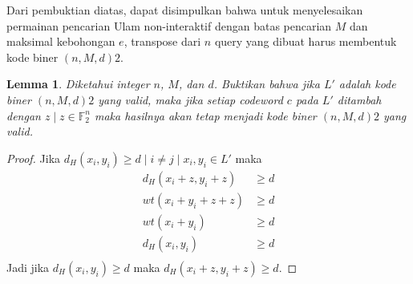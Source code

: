 \documentclass[conference,compsoc]{IEEEtran}
\newtheorem{lemma}[theorem]{Lemma}
\begin{document}
Dari pembuktian diatas, dapat disimpulkan bahwa untuk menyelesaikan permainan pencarian Ulam non-interaktif dengan batas pencarian $M$ dan maksimal kebohongan $e$, transpose dari $n$ query yang dibuat harus membentuk kode biner $(n,M,d)2$.

\begin{lemma}
Diketahui integer $n$, $M$, dan $d$. Buktikan bahwa jika $L'$ adalah kode biner $(n,M,d)2$ yang valid, maka jika setiap codeword $c$ pada $L'$ ditambah dengan $z \mid z \in \mathbb{F}_2^n$ maka hasilnya akan tetap menjadi kode biner $(n,M,d)2$ yang valid.  
\end{lemma}

\begin{proof}
Jika $d_H(x_i,y_i) \ge d \mid i \neq j \mid x_i,y_i \in L'$ maka
\begin{align*}
d_H(x_i+z,y_i+z) &\ge d \\
wt(x_i+y_i+z+z) &\ge d \\
wt(x_i+y_i) &\ge d \\
d_H(x_i,y_i) &\ge d \\
\end{align*}
Jadi jika $d_H(x_i,y_i) \ge d$ maka $d_H(x_i+z,y_i+z) \ge d$.
\end{proof}




\end{document}
